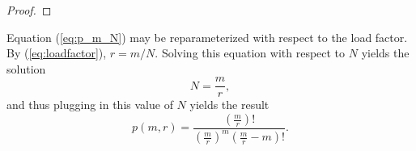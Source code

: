 \documentclass[hidelinks,11pt,final]{article}
\theoremstyle{plain}
\newcommand{\cat}{\mathbin{\#}}
\begin{document}
\begin{proof}
\end{proof}

Equation (\ref{eq:p_m_N}) may be reparameterized with respect to the load factor. By (\ref{eq:loadfactor}), $r = m/N$. Solving this equation with respect to $N$ yields the solution
\begin{equation}
    N = \frac{m}{r},
\end{equation}
and thus plugging in this value of $N$ yields the result
\begin{equation}
\label{eq:p_m_r}
    p(m,r) = \frac{\left(\frac{m}{r}\right)!}{\left(\frac{m}{r}\right)^m \left(\frac{m}{r}-m\right)!}.
\end{equation}
\end{document}
